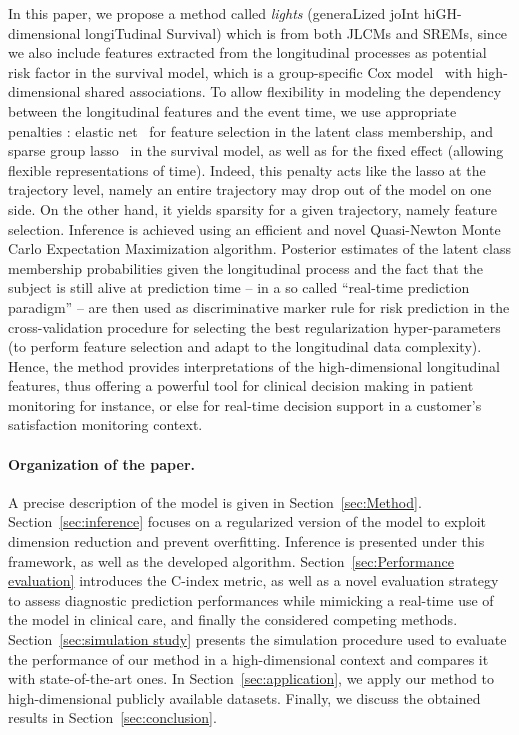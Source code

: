 \documentclass[11pt]{article}
\begin{document}
In this paper, we propose a method called \textit{lights} (generaLized joInt hiGH-dimensional longiTudinal Survival) which is from both JLCMs and SREMs, since we also include features extracted from the longitudinal processes as potential risk factor in the survival model, which is a group-specific Cox model~\citep{Cox1972JRSS} with high-dimensional shared associations.
To allow flexibility in modeling the dependency between the longitudinal features and the event time, we use appropriate penalties : elastic net~\citep{zou2005regularization}
for feature selection in the latent class membership, and sparse group lasso~\citep{simon2013sparse} in the survival model, as well as for the fixed effect (allowing flexible representations of time). Indeed, this penalty acts like the lasso at the trajectory level, namely an entire trajectory may drop out of the model on one side. On the other hand, it yields sparsity for a given trajectory, namely feature selection.
Inference is achieved using an efficient and novel Quasi-Newton Monte Carlo Expectation Maximization algorithm.
Posterior estimates of the latent class membership probabilities given the longitudinal process and the fact that the subject is still alive at prediction time -- in a so called ``real-time prediction paradigm'' -- are then used as discriminative marker rule for risk prediction in the cross-validation procedure for selecting the best regularization hyper-parameters (to perform feature selection and adapt to the longitudinal data complexity).
Hence, the method provides interpretations of the high-dimensional longitudinal features, thus offering a powerful tool for clinical decision making in patient monitoring for instance, or else for real-time decision support in a customer's satisfaction monitoring context.

\paragraph{Organization of the paper.}

A precise description of the model is given in Section~\ref{sec:Method}.
Section~\ref{sec:inference} focuses on a regularized version of the
model to exploit dimension reduction and prevent overfitting. Inference is
presented under this framework, as well as the developed algorithm.
Section~\ref{sec:Performance evaluation} introduces the C-index metric, as well as a novel evaluation strategy to assess diagnostic prediction performances while mimicking a real-time use of the model in clinical care, and finally the considered competing methods.
Section~\ref{sec:simulation study} presents the simulation procedure used to evaluate the performance of our method in a high-dimensional context and compares it with state-of-the-art ones. In Section~\ref{sec:application}, we apply our method to high-dimensional publicly available datasets. Finally, we discuss the obtained results in Section~\ref{sec:conclusion}.
\end{document}
